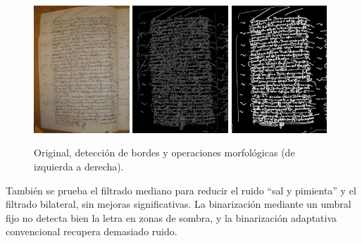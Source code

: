 \documentclass[11pt,a4paper]{article}
\begin{document}
\begin{figure}[h] 
\centering 
\begin{minipage}{1.0\textwidth} 
\includegraphics[width=0.32\textwidth]{CODEA-0205_2v.jpg} 
\includegraphics[width=0.32\textwidth]{canny_image_aftergauss_eq2.png} 
\includegraphics[width=0.32\textwidth]{photo_2025-01-27_21-34-01.jpg} 
\caption{Original, detección de bordes y operaciones morfológicas (de izquierda a derecha).} 
\label{fig:tresfotos} 
\end{minipage} 
\end{figure}

También se prueba el filtrado mediano para reducir el ruido “sal y pimienta” y el filtrado bilateral, sin mejoras significativas. La binarización mediante un umbral fijo no detecta bien la letra en zonas de sombra, y la binarización adaptativa convencional recupera demasiado ruido.\\
\end{document}
